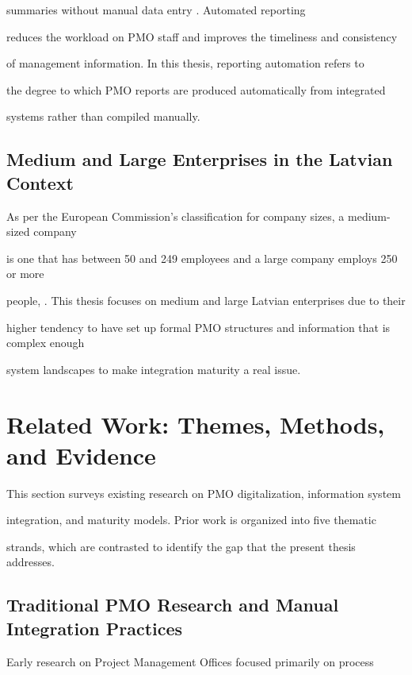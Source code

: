 summaries without manual data entry \cite{pmi2021}. Automated reporting  

reduces the workload on PMO staff and improves the timeliness and consistency  

of management information. In this thesis, reporting automation refers to  

the degree to which PMO reports are produced automatically from integrated  

systems rather than compiled manually. 

 

\subsection{Medium and Large Enterprises in the Latvian Context} 

As per the European Commission's classification for company sizes, a medium-sized company

 is one that has between 50 and 249 employees and a large company employs 250 or more

 people, \cite{ec2003}. This thesis focuses on medium and large Latvian enterprises due to their 

 higher tendency to have set up formal PMO structures and information that is complex enough 

 system landscapes to make integration maturity a real issue.

\section{Related Work: Themes, Methods, and Evidence} 

\label{sec:related} 

This section surveys existing research on PMO digitalization, information system  

integration, and maturity models. Prior work is organized into five thematic  

strands, which are contrasted to identify the gap that the present thesis addresses. 

 

\subsection{Traditional PMO Research and Manual Integration Practices} 

Early research on Project Management Offices focused primarily on process  

